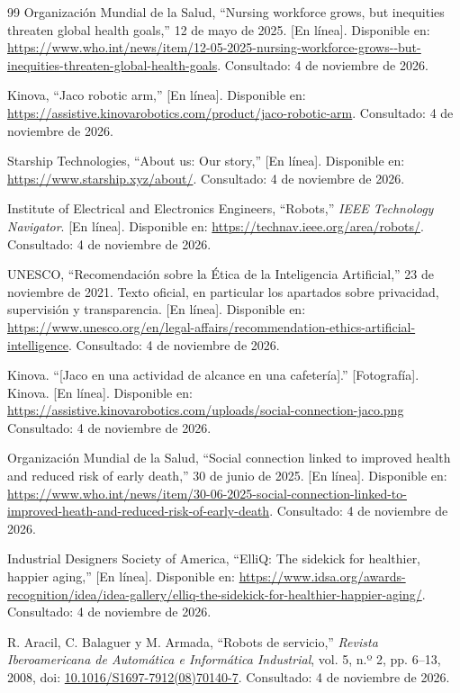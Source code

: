 \documentclass[11pt,a4paper]{article}
\begin{document}
\begin{thebibliography}{99}
Organización Mundial de la Salud, ``Nursing workforce grows, but inequities threaten global health goals,'' 12 de mayo de 2025.
[En línea]. Disponible en: \url{https://www.who.int/news/item/12-05-2025-nursing-workforce-grows--but-inequities-threaten-global-health-goals}. Consultado: 4 de noviembre de 2026.

Kinova, ``Jaco robotic arm,''
[En línea]. Disponible en: \url{https://assistive.kinovarobotics.com/product/jaco-robotic-arm}. Consultado: 4 de noviembre de 2026.

Starship Technologies, ``About us: Our story,'' [En línea]. Disponible en: \url{https://www.starship.xyz/about/}. Consultado: 4 de noviembre de 2026.

Institute of Electrical and Electronics Engineers, ``Robots,'' \emph{IEEE Technology Navigator}. [En línea]. Disponible en: \url{https://technav.ieee.org/area/robots/}. Consultado: 4 de noviembre de 2026.

UNESCO, ``Recomendación sobre la Ética de la Inteligencia Artificial,'' 23 de noviembre de 2021. Texto oficial, en particular los apartados sobre privacidad, supervisión y transparencia.
[En línea]. Disponible en: \url{https://www.unesco.org/en/legal-affairs/recommendation-ethics-artificial-intelligence}. Consultado: 4 de noviembre de 2026.

Kinova. ``[Jaco en una actividad de alcance en una cafetería].'' [Fotografía]. Kinova. [En línea]. Disponible en: \url{https://assistive.kinovarobotics.com/uploads/social-connection-jaco.png} Consultado: 4 de noviembre de 2026.

Organización Mundial de la Salud, ``Social connection linked to improved health and reduced risk of early death,'' 30 de junio de 2025.
[En línea]. Disponible en: \url{https://www.who.int/news/item/30-06-2025-social-connection-linked-to-improved-heath-and-reduced-risk-of-early-death}. Consultado: 4 de noviembre de 2026.

Industrial Designers Society of America, ``ElliQ: The sidekick for healthier, happier aging,'' [En línea]. Disponible en: \url{https://www.idsa.org/awards-recognition/idea/idea-gallery/elliq-the-sidekick-for-healthier-happier-aging/}. Consultado: 4 de noviembre de 2026.

R. Aracil, C. Balaguer y M. Armada, ``Robots de servicio,'' \emph{Revista Iberoamericana de Automática e Informática Industrial}, vol. 5, n.º 2, pp. 6--13, 2008, doi: \href{https://doi.org/10.1016/S1697-7912(08)70140-7}{10.1016/S1697-7912(08)70140-7}. Consultado: 4 de noviembre de 2026.


\end{thebibliography}
\end{document}
